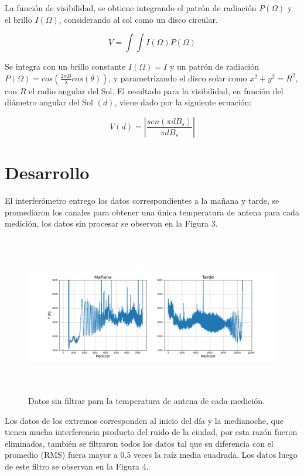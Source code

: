 \documentclass[letterpaper,oneside]{article}
\begin{document}
La función de visibilidad, se obtiene integrando el patrón de radiación $P(\Omega)$ y el brillo $I(\Omega)$, considerando al sol como un disco circular.

$$V = \int \int I(\Omega)P(\Omega)$$

Se integra con un brillo constante $I(\Omega)=I$ y un patrón de radiación $P(\Omega)=cos(\frac{2\pi B}{\lambda}cos(\theta))$, y parametrizando el disco solar como $x^2 + y^2 = R^2$, con $R$  el radio angular del Sol. El resultado para la visibilidad, en función del diámetro angular del Sol $(d)$, viene dado por la siguiente ecuación:

\begin{equation}
    V(d) = \left |\frac{sen(\pi d B_s)}{\pi d B_s} \right |
\end{equation}

\section{Desarrollo}
El interferómetro entrego los datos correspondientes a la mañana y tarde, se promediaron los canales para obtener una única temperatura de antena para cada medición, los datos sin procesar se observan en la Figura 3.\\

\begin{figure}
  \centering
  \includegraphics[height=7cm]{../graficos/rawdata.png}
  \caption{Datos sin filtrar para la temperatura de antena de cada medición.}
\end{figure}

Los datos de los extremos corresponden al inicio del día y la medianoche, que tienen mucha interferencia producto del ruido de la ciudad, por esta razón fueron eliminados, también se filtraron todos los datos tal que su diferencia con el promedio (RMS) fuera mayor a $0.5$ veces la raíz media cuadrada. Los datos luego de este filtro se observan en la Figura 4.\\
\end{document}
